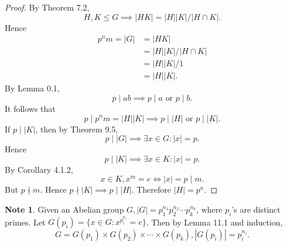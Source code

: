 \documentclass{article}
\newtheorem{lemma}{Lemma}[section]
\theoremstyle{definition}
\newtheorem{note}{Note}[section]
\begin{document}
\begin{proof}
       By Theorem 7.2,
       \begin{equation*}
           H,K \leq G \implies |HK|=|H||K|/|H\cap K|.
       \end{equation*}
       Hence
       \begin{align*}
           p^nm=|G|&=|HK|\\
           &=|H||K|/|H\cap K|\\
           &=|H||K|/1\\
           &=|H||K|. 
       \end{align*}
       By Lemma 0.1,
       \begin{equation*}
           p\mid ab \implies p\mid a \text{ or } p\mid b.
       \end{equation*}
       It follows that 
       \begin{equation*}
           p\mid p^nm=|H||K| \implies p\mid |H| \text{ or } p\mid |K|.
       \end{equation*}
       If $p\mid|K|$, then by Theorem 9.5,
       \begin{equation*}
           p\mid|G|\implies \exists x\in G:|x|=p.
       \end{equation*}
       Hence
       \begin{equation*}
           p\mid|K| \implies \exists x \in K:|x|=p.
       \end{equation*}
       By Corollary 4.1.2,
       \begin{equation*}
           x \in K, x^m=e \iff |x|=p\mid m.
       \end{equation*}
       But $p \nmid m$. Hence $p\nmid|K|\implies p\mid |H|$. Therefore $|H|=p^n$.
    \end{proof}
    
    \begin{note}
        Given an Abelian group $G,|G|=p_1^{n_1}p_2^{n_2}\cdots p_k^{n_k}$, where $p_i$'s are distinct primes. Let $G(p_i)=\{x\in G: x^{p_i^{n_i}}=e\}$. Then by Lemma 11.1 and induction,
        \begin{equation*}
            G=G(p_1)\times G(p_2)\times\cdots\times G(p_k), |G(p_i)|=p_i^{n_i}.
        \end{equation*}
    \end{note}
    
    \noindent{}
    
\end{document}

